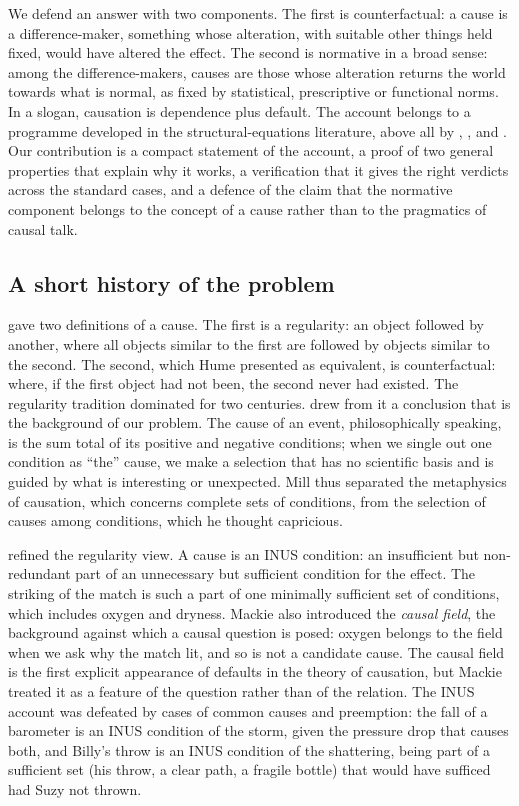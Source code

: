 \documentclass{situationist-preprint}
\begin{document}
We defend an answer with two components. The first is counterfactual: a cause is a difference-maker, something whose alteration, with suitable other things held fixed, would have altered the effect. The second is normative in a broad sense: among the difference-makers, causes are those whose alteration returns the world towards what is normal, as fixed by statistical, prescriptive or functional norms. In a slogan, causation is dependence plus default. The account belongs to a programme developed in the structural-equations literature, above all by \citet{Hitchcock2007}, \citet{HitchcockKnobe2009}, \citet{HalpernHitchcock2015} and \citet{Halpern2016}. Our contribution is a compact statement of the account, a proof of two general properties that explain why it works, a verification that it gives the right verdicts across the standard cases, and a defence of the claim that the normative component belongs to the concept of a cause rather than to the pragmatics of causal talk.

\subsection{A short history of the problem}\label{s:history}

\citet[\S VII]{HumeEnquiry} gave two definitions of a cause. The first is a regularity: an object followed by another, where all objects similar to the first are followed by objects similar to the second. The second, which Hume presented as equivalent, is counterfactual: where, if the first object had not been, the second never had existed. The regularity tradition dominated for two centuries. \citet[III.v.3]{Mill1843} drew from it a conclusion that is the background of our problem. The cause of an event, philosophically speaking, is the sum total of its positive and negative conditions; when we single out one condition as \enquote{the} cause, we make a selection that has no scientific basis and is guided by what is interesting or unexpected. Mill thus separated the metaphysics of causation, which concerns complete sets of conditions, from the selection of causes among conditions, which he thought capricious.

\citet{Mackie1965} refined the regularity view. A cause is an INUS condition: an insufficient but non-redundant part of an unnecessary but sufficient condition for the effect. The striking of the match is such a part of one minimally sufficient set of conditions, which includes oxygen and dryness. Mackie also introduced the \emph{causal field}, the background against which a causal question is posed: oxygen belongs to the field when we ask why the match lit, and so is not a candidate cause. The causal field is the first explicit appearance of defaults in the theory of causation, but Mackie treated it as a feature of the question rather than of the relation. The INUS account was defeated by cases of common causes and preemption: the fall of a barometer is an INUS condition of the storm, given the pressure drop that causes both, and Billy's throw is an INUS condition of the shattering, being part of a sufficient set (his throw, a clear path, a fragile bottle) that would have sufficed had Suzy not thrown.
\end{document}
